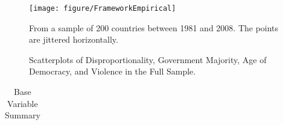 \documentclass[a4paper]{article}\usepackage{graphicx, color}
\newenvironment{knitrout}{}{} %
\begin{document}
{{%
\begin{figure}[t]
    \caption{Scatterplots of Disproportionality, Government Majority, Age of Democracy, and Violence in the Full Sample.}  
    \label{framework_empirical}
    \begin{center}

\begin{knitrout}
\color{fgcolor}
\texttt{[image: figure/FrameworkEmpirical]} 

\end{knitrout}

    \end{center}
    \begin{singlespace}
        {\scriptsize{From a sample of 200 countries between 1981 and 2008. The points are jittered horizontally.}}
    \end{singlespace}

\end{figure}

\begin{table}[!h]
    \begin{center}
    \caption{Base Variable Summary}
    \label{var_summary}
    \begin{tabular}{l m{7cm} m{3.5cm}}


\end{tabular}
\end{center}
\end{table}}}
\end{document}
